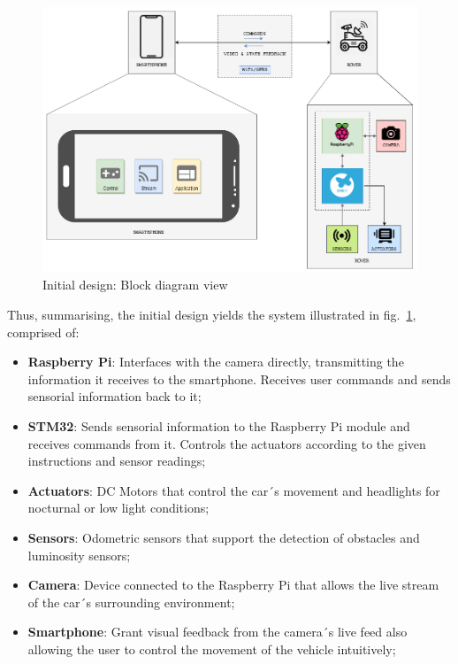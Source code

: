 \begin{figure}[!ht]
\centering
\includegraphics[width=1.0\textwidth]{./sec/img/initial_design_diagram.png}
\caption{\label{fig:initial-design}Initial design: Block diagram view}
\end{figure}

Thus, summarising, the initial design yields the system illustrated in
fig.~\ref{fig:initial-design}, comprised of:

\begin{itemize}
\item \textbf{ Raspberry Pi}: Interfaces with the camera directly, transmitting the information it receives to the smartphone. Receives user commands and sends sensorial information back to it;

\item \textbf{STM32}: Sends sensorial information to the Raspberry Pi module and receives commands from it. Controls the actuators according to the given instructions and sensor readings;

\item \textbf{Actuators}: DC Motors that control the car´s movement and headlights for nocturnal or low light conditions;

\item \textbf{Sensors}: Odometric sensors that support the detection of obstacles and luminosity sensors;

\item \textbf{Camera}: Device connected to the Raspberry Pi that allows the live stream of the car´s surrounding environment;

\item \textbf{Smartphone}: Grant visual feedback from the camera´s live feed also allowing the user to control the movement of the vehicle intuitively;

\end{itemize}

